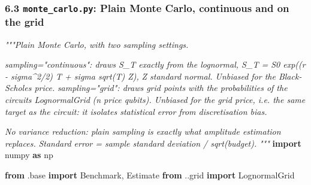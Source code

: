 \documentclass[
  10pt,
]{article}
\newenvironment{Shaded}{}{}
\newcommand{\CommentTok}[1]{\textcolor[rgb]{0.38,0.63,0.69}{\textit{#1}}}
\newcommand{\ImportTok}[1]{\textcolor[rgb]{0.00,0.50,0.00}{\textbf{#1}}}
\newcommand{\NormalTok}[1]{#1}
\begin{document}
\hypertarget{63-monte_carlopy-plain-monte-carlo-continuous-and-on-the-grid}{%
\subsubsection{\texorpdfstring{6.3 \texttt{monte\_carlo.py}: Plain Monte
Carlo, continuous and on the
grid}{6.3 monte\_carlo.py: Plain Monte Carlo, continuous and on the grid}}\label{63-monte_carlopy-plain-monte-carlo-continuous-and-on-the-grid}}

\begin{Shaded}
\begin{Highlighting}[]
\CommentTok{"""Plain Monte Carlo, with two sampling settings.}

\CommentTok{sampling="continuous": draws S\_T exactly from the lognormal, S\_T = S0 exp((r {-} sigma\^{}2/2) T + sigma sqrt(T) Z),}
\CommentTok{                       Z standard normal. Unbiased for the Black{-}Scholes price.}
\CommentTok{sampling="grid":       draws grid points with the probabilities of the circuit\textquotesingle{}s LognormalGrid}
\CommentTok{                       (n price qubits). Unbiased for the grid price, i.e. the same target as the circuit:}
\CommentTok{                       it isolates statistical error from discretisation bias.}

\CommentTok{No variance reduction: plain sampling is exactly what amplitude estimation replaces.}
\CommentTok{Standard error = sample standard deviation / sqrt(budget).}
\CommentTok{"""}
\ImportTok{import}\NormalTok{ numpy }\ImportTok{as}\NormalTok{ np}

\ImportTok{from}\NormalTok{ .base }\ImportTok{import}\NormalTok{ Benchmark, Estimate}
\ImportTok{from}\NormalTok{ ..grid }\ImportTok{import}\NormalTok{ LognormalGrid}



\end{Highlighting}
\end{Shaded}
\end{document}
